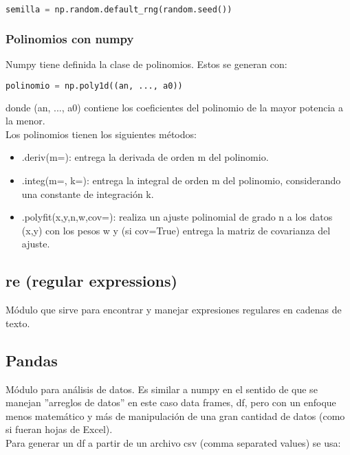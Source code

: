\documentclass[10pt,oneside]{article}
\begin{document}
\begin{multicols}{2}
                \begin{lstlisting}[language=Python]
semilla = np.random.default_rng(random.seed())
                \end{lstlisting}
            
                \subsubsection{Polinomios con numpy}

                Numpy tiene definida la clase de polinomios. Estos se generan con:
                
                \begin{lstlisting}[language=Python]
polinomio = np.poly1d((an, ..., a0))                   
                \end{lstlisting}
                donde (an, ..., a0) contiene los coeficientes del polinomio de la mayor potencia a la menor.\\ \newline Los polinomios tienen los siguientes métodos: 

                \begin{itemize}
                    \item .deriv(m=): entrega la derivada de orden m del polinomio.
                    \item .integ(m=, k=): entrega la integral de orden m del polinomio, considerando una constante de integración k.
                    \item  .polyfit(x,y,n,w,cov=): realiza un ajuste polinomial de grado n a los datos (x,y) con los pesos w y (si cov=True) entrega la matriz de covarianza del ajuste.
                \end{itemize}
                
                \subsection{re (regular expressions)}
                Módulo que sirve para encontrar y manejar expresiones regulares en cadenas de texto. 

                
                
                \subsection{Pandas}
                Módulo para análisis de datos. Es similar a numpy en el sentido de que se manejan ''arreglos de datos'' en este caso data frames, df, pero con un enfoque menos matemático y más de manipulación de una gran cantidad de datos (como si fueran hojas de Excel).\\ Para generar un df a partir de un archivo csv (comma separated values) se usa:


\end{multicols}
\end{document}
